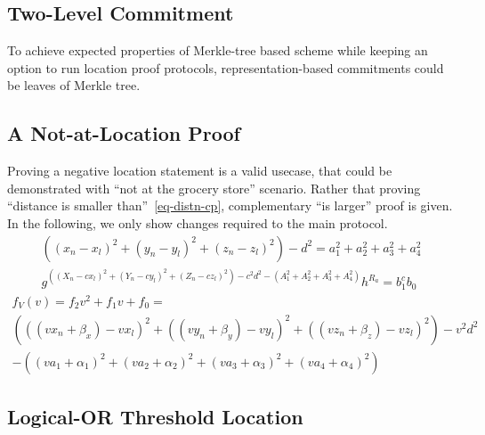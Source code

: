 \documentclass{article}
\begin{document}
\subsection{Two-Level Commitment}
To achieve expected properties of Merkle-tree based scheme while keeping an option
to run location proof protocols,
representation-based commitments could be leaves of Merkle tree.

\subsection{A Not-at-Location Proof}

Proving a negative location statement is a valid usecase,
that could be demonstrated with ``not at the grocery store'' scenario.
Rather that proving ``distance is smaller than''~\eqref{eq-distn-cp},
complementary ``is larger'' proof is given. %
In the following, we only show changes required to the main protocol.
\begin{gather}
\label{eq-distn-more}
  ((x_n - x_l)^2 + (y_n - y_l)^2 + (z_n - z_l)^2) - d^2 = a_1^2 + a_2^2 + a_3^2 + a_4^2  \\
\label{verf-distn-more}
  g^{((X_n - c x_l)^2 + (Y_n - c y_l)^2 + (Z_n - c z_l)^2 ) - c^2 d^2 - (A_1^2 + A_2^2 + A_3^2 + A_4^2)} h^{R_a} = b_1^{c} b_0 
\end{gather}
\begin{multline}
\label{eq-coeff-more}
  f_V(v) = f_2 v^2 + f_1 v + f_0 = \\
  (((v x_n + \beta_x) - v x_l)^2 +
   ((v y_n + \beta_y) - v y_l)^2 +
   ((v z_n + \beta_z) - v z_l)^2)
  - v^2 d^2 \\
  - ((v a_1 + \alpha_1)^2 +
     (v a_2 + \alpha_2)^2 +
     (v a_3 + \alpha_3)^2 +
     (v a_4 + \alpha_4)^2)
\end{multline}

\subsection{Logical-OR Threshold Location}
\end{document}
